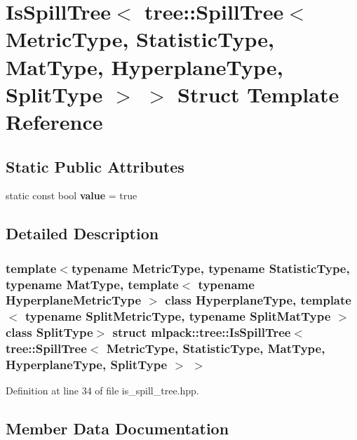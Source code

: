 \section{Is\+Spill\+Tree$<$ tree\+:\+:Spill\+Tree$<$ Metric\+Type, Statistic\+Type, Mat\+Type, Hyperplane\+Type, Split\+Type $>$ $>$ Struct Template Reference}
\label{structmlpack_1_1tree_1_1IsSpillTree_3_01tree_1_1SpillTree_3_01MetricType_00_01StatisticType_00_0d41f2b10e451850b8eb14d3156c51340}
\subsection*{Static Public Attributes}
\begin{DoxyCompactItemize}
\item 
static const bool \textbf{ value} = true
\end{DoxyCompactItemize}


\subsection{Detailed Description}
\subsubsection*{template$<$typename Metric\+Type, typename Statistic\+Type, typename Mat\+Type, template$<$ typename Hyperplane\+Metric\+Type $>$ class Hyperplane\+Type, template$<$ typename Split\+Metric\+Type, typename Split\+Mat\+Type $>$ class Split\+Type$>$\newline
struct mlpack\+::tree\+::\+Is\+Spill\+Tree$<$ tree\+::\+Spill\+Tree$<$ Metric\+Type, Statistic\+Type, Mat\+Type, Hyperplane\+Type, Split\+Type $>$ $>$}



Definition at line 34 of file is\+\_\+spill\+\_\+tree.\+hpp.



\subsection{Member Data Documentation}
\mbox{\label{structmlpack_1_1tree_1_1IsSpillTree_3_01tree_1_1SpillTree_3_01MetricType_00_01StatisticType_00_0d41f2b10e451850b8eb14d3156c51340_a11ddd051208250c32dc4985abcafa86d}} 
